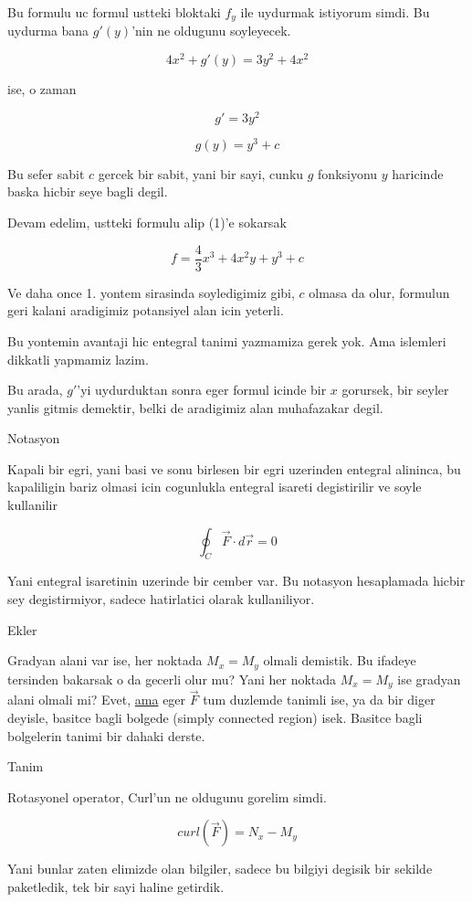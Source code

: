 \documentclass[12pt,fleqn]{article}\usepackage{../common}
\begin{document}
Bu formulu uc formul ustteki bloktaki $f_y$ ile uydurmak istiyorum
simdi. Bu uydurma bana $g'(y)$'nin ne oldugunu soyleyecek. 

\[ 4x^2 + g'(y) = 3y^2 + 4x^2 \]

ise, o zaman

\[ g' = 3y^2 \]

\[ g(y) = y^3 + c \]

Bu sefer sabit $c$ gercek bir sabit, yani bir sayi, cunku $g$ fonksiyonu
$y$ haricinde baska hicbir seye bagli degil. 

Devam edelim, ustteki formulu alip (1)'e sokarsak

\[ f = \frac{4}{3}x^3 + 4x^2y + y^3 + c\]

Ve daha once 1. yontem sirasinda soyledigimiz gibi, $c$ olmasa da olur,
formulun geri kalani aradigimiz potansiyel alan icin yeterli. 

Bu yontemin avantaji hic entegral tanimi yazmamiza gerek yok. Ama islemleri
dikkatli yapmamiz lazim. 

Bu arada, $g'$'yi uydurduktan sonra eger formul icinde bir $x$ gorursek,
bir seyler yanlis gitmis demektir, belki de aradigimiz alan muhafazakar
degil. 

Notasyon 

Kapali bir egri, yani basi ve sonu birlesen bir egri uzerinden entegral
alininca, bu kapaliligin bariz olmasi icin cogunlukla entegral isareti
degistirilir ve soyle kullanilir 

\[ \oint_{C} \vec{F} \cdot d\vec{r} = 0\]

Yani entegral isaretinin uzerinde bir cember var. Bu notasyon hesaplamada
hicbir sey degistirmiyor, sadece hatirlatici olarak kullaniliyor. 

Ekler

Gradyan alani var ise, her noktada $M_x = M_y$ olmali demistik. Bu ifadeye
tersinden bakarsak o da gecerli olur mu? Yani her noktada $M_x = M_y$ ise
gradyan alani olmali mi? Evet, \underline{ama} eger $\vec{F}$ tum duzlemde
tanimli ise, ya da bir diger deyisle, basitce bagli bolgede (simply
connected region) isek. Basitce bagli bolgelerin tanimi bir dahaki derste. 

Tanim

Rotasyonel operator, Curl'un ne oldugunu gorelim simdi. 

\[ curl(\vec{F}) = N_x - M_y \]

Yani bunlar zaten elimizde olan bilgiler, sadece bu bilgiyi degisik bir
sekilde paketledik, tek bir sayi haline getirdik. 
\end{document}
